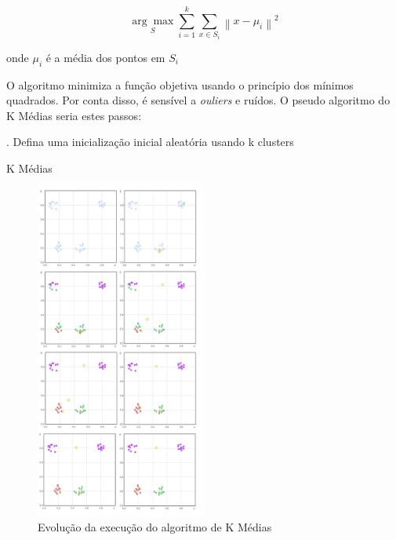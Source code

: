 \begin{equation}
\label{eq:media}
\underset{S}{\arg\max} \sum_{i=1}^{k} \sum_{x \in S_{i}}\left \| x - \mu_{i} \right \|^{2}
\end{equation}

onde \begin{math}\mu_{i}\end{math} é a média dos pontos em \begin{math}S_{i}\end{math}

O algoritmo minimiza a função objetiva usando o princípio dos mínimos quadrados. Por conta disso, é sensível a \emph{ouliers} e ruídos. O pseudo algoritmo do K Médias seria estes passos:\\

\begin{algorithm}[H]
. Defina uma inicialização inicial aleatória usando k clusters\;
 \caption{K Médias}
\end{algorithm}

\vspace{5mm}


\begin{figure}[!ht]
\caption{Evolução da execução do algoritmo de K Médias }
\centerline{\includegraphics[width=0.5\textwidth]{img/k-means}}
\end{figure}



